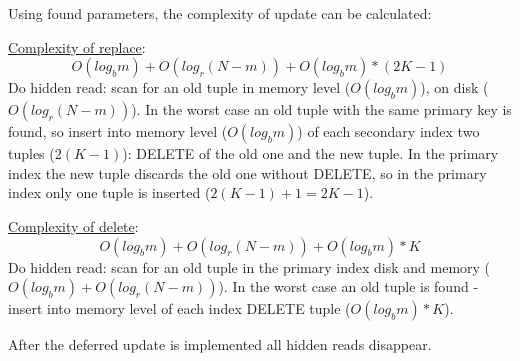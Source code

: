 \documentclass{vldb}
\begin{document}
Using found parameters, the complexity of update can be calculated:

\underline{Complexity of replace}:
\begin{displaymath}
O(log_bm) + O(log_r(N - m)) + O(log_bm) * (2K - 1)
\end{displaymath}
Do hidden read: scan for an old tuple in memory level ($O(log_bm)$), on
disk ($O(log_r(N - m))$). In the worst case an old tuple with the same primary
key is found, so insert into memory level ($O(log_bm)$) of each secondary index
two tuples ($2(K - 1)$): DELETE of the old one and the new tuple. In the primary
index the new tuple discards the old one without DELETE, so in the primary
index only one tuple is inserted ($2(K - 1) + 1 = 2K - 1$).

\underline{Complexity of delete}:
\begin{displaymath}
O(log_bm) + O(log_r(N - m)) + O(log_bm) * K
\end{displaymath}
Do hidden read: scan for an old tuple in the primary index disk and memory
($O(log_bm) + O(log_r(N - m))$). In the worst case an old tuple is found -
insert into memory level of each index DELETE tuple ($O(log_bm) * K$).

After the deferred update is implemented all hidden reads disappear.
\end{document}

